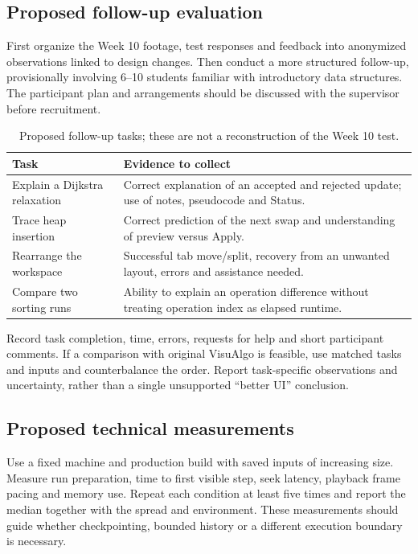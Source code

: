 \documentclass[11pt,a4paper]{article}
\begin{document}
\subsection{Proposed follow-up evaluation}
First organize the Week 10 footage, test responses and feedback into anonymized observations linked to design changes. Then conduct a more structured follow-up, provisionally involving 6--10 students familiar with introductory data structures. The participant plan and arrangements should be discussed with the supervisor before recruitment.

\begin{table}[tbp]\small\centering
\caption{Proposed follow-up tasks; these are not a reconstruction of the Week 10 test.}
\begin{tabularx}{\linewidth}{@{}p{41mm}X@{}}\toprule
Task & Evidence to collect\\\midrule
Explain a Dijkstra relaxation & Correct explanation of an accepted and rejected update; use of notes, pseudocode and Status.\\
Trace heap insertion & Correct prediction of the next swap and understanding of preview versus Apply.\\
Rearrange the workspace & Successful tab move/split, recovery from an unwanted layout, errors and assistance needed.\\
Compare two sorting runs & Ability to explain an operation difference without treating operation index as elapsed runtime.\\\bottomrule
\end{tabularx}
\end{table}

Record task completion, time, errors, requests for help and short participant comments. If a comparison with original VisuAlgo is feasible, use matched tasks and inputs and counterbalance the order. Report task-specific observations and uncertainty, rather than a single unsupported ``better UI'' conclusion.

\subsection{Proposed technical measurements}
Use a fixed machine and production build with saved inputs of increasing size. Measure run preparation, time to first visible step, seek latency, playback frame pacing and memory use. Repeat each condition at least five times and report the median together with the spread and environment. These measurements should guide whether checkpointing, bounded history or a different execution boundary is necessary.
\end{document}
